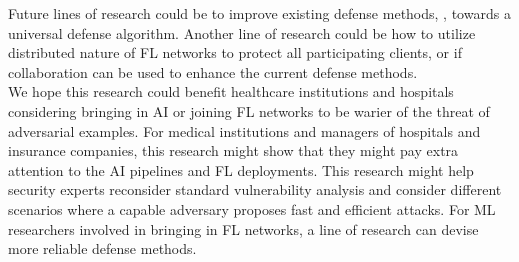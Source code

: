 Future lines of research could be to improve existing defense methods,\cite{sun2019can,wang2020attack,shao2019stochastic,li2019distributed,ma2019privacy,li2020multi ,yin2022adc,zheng2020efficient,yuan2019adversarial,uesato2018adversarial} , towards a universal defense algorithm. Another line of research could be how to utilize distributed nature of FL networks to protect all participating clients, or if collaboration can be used to enhance the current defense methods.\\
We hope this research could benefit healthcare institutions and hospitals considering bringing in AI or joining FL networks to be warier of the threat of adversarial examples. For medical institutions and managers of hospitals and insurance companies, this research might show that they might pay extra attention to the AI pipelines and FL deployments. This research might help security experts reconsider standard vulnerability analysis and consider different scenarios where a capable adversary proposes fast and efficient attacks. For ML researchers involved in bringing in FL networks, a line of research can devise more reliable defense methods.
